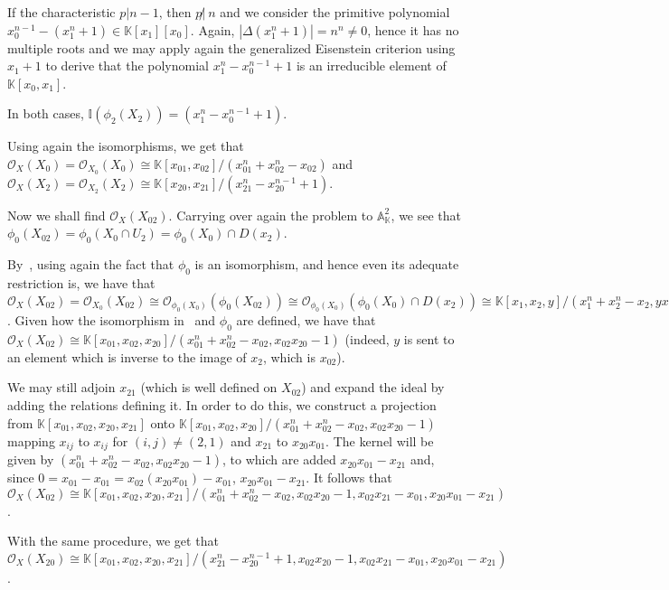 \documentclass{article}
\newcommand{\numberset}{\mathbb}
\newcommand{\K}{\numberset{K}}
\newcommand{\I}{\mathbb{I}}
\newcommand{\A}{\mathbb{A}}
\begin{document}
If the characteristic $p|n-1$, then $p\not |\ n$ and we consider the primitive polynomial $x_0^{n-1}-(x_1^n+1)\in\K[x_1][x_0]$. Again, $|\Delta(x_1^n+1)|=n^n\neq 0$, hence it has no multiple roots and we may apply again the generalized Eisenstein criterion using $x_1+1$ to derive that the polynomial $x_1^n-x_0^{n-1}+1$ is an irreducible element of $\K[x_0,x_1]$.

In both cases, $\I(\phi_2(X_2))=(x_1^n-x_0^{n-1}+1)$.

Using again the isomorphisms, we get that $\mathcal{O}_X(X_0)=\mathcal{O}_{X_0}(X_0)\cong\K[x_{01},x_{02}]/(x_{01}^n+x_{02}^n-x_{02})$ and $\mathcal{O}_X(X_2)=\mathcal{O}_{X_2}(X_2)\cong\K[x_{20},x_{21}]/(x_{21}^n-x_{20}^{n-1}+1)$.

Now we shall find $\mathcal{O}_X(X_{02})$. Carrying over again the problem to $\A^2_{\K}$, we see that $\phi_0(X_{02})=\phi_0(X_0\cap U_2)=\phi_0(X_0)\cap D(x_2)$.

By~\cite[thm. 5.1.7]{edix}, using again the fact that $\phi_0$ is an isomorphism, and hence even its adequate restriction is, we have that $\mathcal{O}_X(X_{02})=\mathcal{O}_{X_0}(X_{02})\cong\mathcal{O}_{\phi_0(X_0)}(\phi_0(X_{02}))\cong\mathcal{O}_{\phi_0(X_0)}(\phi_0(X_0)\cap D(x_2))\cong\K[x_1,x_2,y]/(x_1^n+x_2^n-x_2,yx_2-1)$. Given how the isomorphism in~\cite[thm. 5.1.7]{edix} and $\phi_0$ are defined, we have that $\mathcal{O}_X(X_{02})\cong\K[x_{01},x_{02},x_{20}]/(x_{01}^n+x_{02}^n-x_{02},x_{02}x_{20}-1)$ (indeed, $y$ is sent to an element which is inverse to the image of $x_2$, which is $x_{02}$).

We may still adjoin $x_{21}$ (which is well defined on $X_{02}$) and expand the ideal by adding the relations defining it. In order to do this, we construct a projection from $\K[x_{01},x_{02},x_{20},x_{21}]$ onto $\K[x_{01},x_{02},x_{20}]/(x_{01}^n+x_{02}^n-x_{02},x_{02}x_{20}-1)$ mapping $x_{ij}$ to $x_{ij}$ for $(i,j)\neq (2,1)$ and $x_{21}$ to $x_{20}x_{01}$. The kernel will be given by $(x_{01}^n+x_{02}^n-x_{02},x_{02}x_{20}-1)$, to which are added $x_{20}x_{01}-x_{21}$ and, since $0=x_{01}-x_{01}=x_{02}(x_{20}x_{01})-x_{01}$, $x_{20}x_{01}-x_{21}$. It follows that $\mathcal{O}_X(X_{02})\cong\K[x_{01},x_{02},x_{20},x_{21}]/(x_{01}^n+x_{02}^n-x_{02},x_{02}x_{20}-1,x_{02}x_{21}-x_{01},x_{20}x_{01}-x_{21})$.

With the same procedure, we get that $\mathcal{O}_X(X_{20})\cong\K[x_{01},x_{02},x_{20},x_{21}]/(x_{21}^n-x_{20}^{n-1}+1,x_{02}x_{20}-1,x_{02}x_{21}-x_{01},x_{20}x_{01}-x_{21})$.
\end{document}
